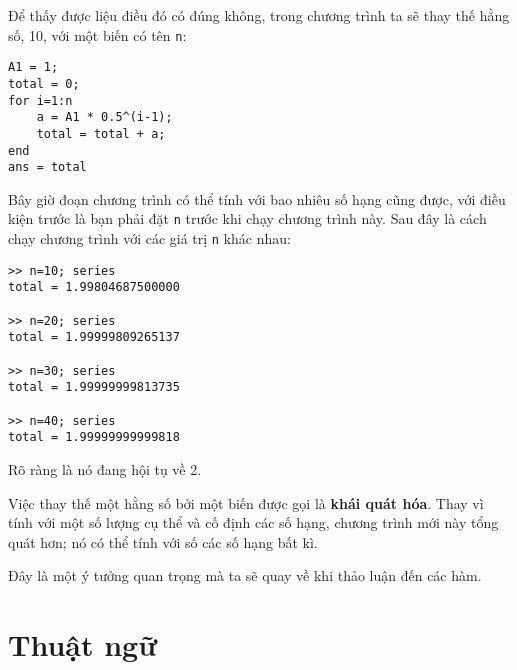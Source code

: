 \documentclass[12pt]{book}
\begin{document}
Để thấy được liệu điều đó có đúng không, trong chương trình
ta sẽ thay thế hằng số, 10, với một biến có tên {\tt n}:

\begin{verbatim}
A1 = 1;
total = 0;
for i=1:n
    a = A1 * 0.5^(i-1);
    total = total + a;
end
ans = total
\end{verbatim}

Bây giờ đoạn chương trình có thể tính với bao nhiêu số hạng
cũng được, với điều kiện trước là bạn phải đặt {\tt n} trước khi
chạy chương trình này. Sau đây là cách chạy chương trình
với các giá trị {\tt n} khác nhau:

\begin{verbatim}
>> n=10; series
total = 1.99804687500000

>> n=20; series
total = 1.99999809265137

>> n=30; series
total = 1.99999999813735

>> n=40; series
total = 1.99999999999818
\end{verbatim}
%
Rõ ràng là nó đang hội tụ về 2.

Việc thay thế một hằng số bởi một biến được gọi là 
{\bf khái quát hóa}. Thay vì tính với một số lượng cụ thể 
và cố định các số hạng, chương trình mới này tổng quát hơn;
nó có thể tính với số các số hạng bất kì.

Đây là một ý tưởng quan trọng mà ta sẽ quay về khi thảo luận
đến các hàm.


\section{Thuật ngữ}
\end{document}

